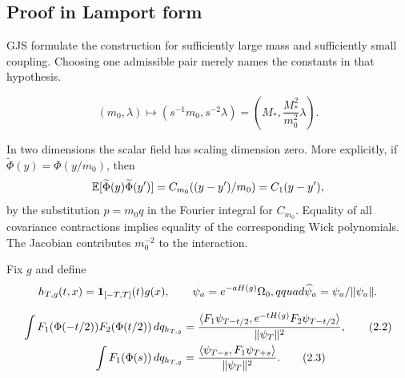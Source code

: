 \documentclass[11pt,a4paper]{article}
\begin{document}
\subsection*{Proof in Lamport form}



\Because GJS formulate the construction for sufficiently large mass and sufficiently
small coupling.  Choosing one admissible pair merely names the constants in that
hypothesis.

\[
 (m_0,\lambda)\longmapsto (s^{-1}m_0,s^{-2}\lambda)
       =\left(M_*,\frac{M_*^2}{m_0^2}\lambda\right).                 \tag{2.1}
\]


\Because In two dimensions the scalar field has scaling dimension zero.  More
explicitly, if $\widetilde\Phi(y)=\Phi(y/m_0)$, then
\[
 \mathbb E[\widetilde\Phi(y)\widetilde\Phi(y')]
 =C_{m_0}((y-y')/m_0)=C_1(y-y'),
\]
by the substitution $p=m_0q$ in the Fourier integral for $C_{m_0}$.  Equality of
all covariance contractions implies equality of the corresponding Wick polynomials.
The Jacobian contributes $m_0^{-2}$ to the interaction.


\QedStep


Fix $g$ and define
\[
 h_{T,g}(t,x)=\mathbf1_{[-T,T]}(t)g(x),\qquad
 \psi_a=e^{-aH(g)}\Omega_0,qquad \widehat\psi_a=\psi_a/\|\psi_a\|.
\]

\begin{align}
 \int F_1(\Phi(-t/2))F_2(\Phi(t/2))\,dq_{h_{T,g}}
 &=\frac{\langle F_1\psi_{T-t/2},e^{-tH(g)}F_2\psi_{T-t/2}\rangle}
         {\|\psi_T\|^2},                                           \tag{2.2}\\
 \int F_1(\Phi(s))\,dq_{h_{T,g}}
 &=\frac{\langle \psi_{T-s},F_1\psi_{T+s}\rangle}{\|\psi_T\|^2}.          \tag{2.3}
\end{align}
\end{document}
